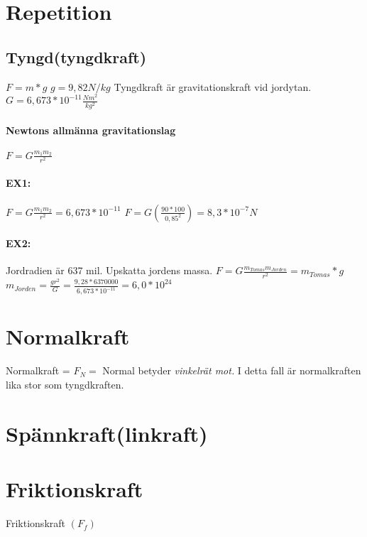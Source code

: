 \documentclass[a4paper,11pt]{article}
\begin{document}
\begin{flushleft}
\section{Repetition}
\subsection{Tyngd(tyngdkraft)}
$ F=m*g $\newline
$ g=9,82 N/kg $\newline
Tyngdkraft är gravitationskraft vid jordytan.\newline
$ G=6,673*10^{-11}\frac{Nm^2}{kg^2} $
\paragraph{Newtons allmänna gravitationslag}
$ F=G\frac{m_1 m_2}{r^2} $
\paragraph{EX1:}
$ F=G\frac{m_1 m_2}{r^2}=6,673*10^{-11} $\newline
$ F=G(\frac{90*100}{0,85^2})=8,3*10^{-7}N $\newline
\paragraph{EX2:}
Jordradien är 637 mil. Upskatta jordens massa.\newline
$ F=G\frac{m_{Tomas} m_{Jorden}}{r^2}=m_{Tomas}*g $\newline
$ m_{Jorden}=\frac{gr^2}{G}=\frac{9,28*6370000}{6,673*10^{-11}}=6,0*10^{24} $
\section{Normalkraft}
Normalkraft = $F_N=$\newline
Normal betyder \textit{vinkelrät mot.}\newline
I detta fall är normalkraften lika stor som tyngdkraften.
\section{Spännkraft(linkraft)}
\section{Friktionskraft}
Friktionskraft $( F_f )$\newline

\end{flushleft}
\end{document}
